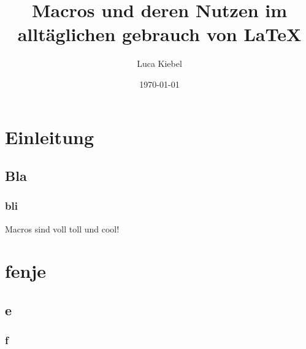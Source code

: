 \documentclass[ngerman]{scrreprt}
\title{Macros und deren Nutzen im alltäglichen gebrauch von \LaTeX}
\author{Luca Kiebel}
\date{\today}
\begin{document}
\maketitle
\newpage
	\tableofcontents
\newpage

\chapter{Einleitung}
\label{cha:Einleitung}
\section{Bla}
\subsection{bli}

\cite{test}
Macros sind voll toll und cool!

\chapter{fenje}
\section{e}
\subsection{f}





{}

\end{document}
